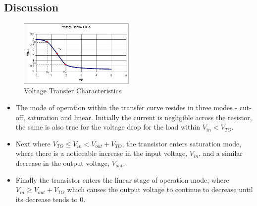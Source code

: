 \documentclass[12pt]{article}
\begin{document}
\subsection{Discussion}
\begin{figure}[H]
\centering
\includegraphics[width=0.5\textwidth]{4.jpg}
\caption{Voltage Transfer Characteristics}
\end{figure}

\begin{itemize}
\item The mode of operation within the transfer curve resides in three modes - cut-off, saturation and linear. Initially the current is negligible across the resistor, the same is also true for the voltage drop for the load within $V_{in}<V_{TO}$.
\item Next where $V_{TO}\leq V_{in}<V_{out}+V_{TO}$, the transistor enters saturation mode, where there is a noticeable increase in the input voltage, $V_{in}$, and a similar decrease in the output voltage, $V_{out}$.
\item Finally the transistor enters the linear stage of operation mode, where $V_{in} \geq V_{out} + V_{TO}$ which causes the output voltage to continue to decrease until its decrease tends to 0.
\end{itemize}
\end{document}
